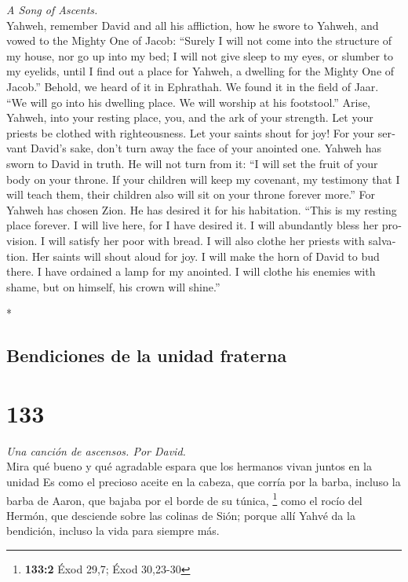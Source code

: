 \begin{paracol}{2}
\begin{otherlanguage}{english}
\emph{A Song of Ascents.}\\
 Yahweh, remember David and all his affliction,
 how he swore to Yahweh, and vowed to the Mighty One of
Jacob:  ``Surely I will not come into the structure of my
house, nor go up into my bed;  I will not give sleep to my
eyes, or slumber to my eyelids,  until I find out a place
for Yahweh, a dwelling for the Mighty One of Jacob.'' 
Behold, we heard of it in Ephrathah. We found it in the field of Jaar.
 ``We will go into his dwelling place. We will worship at
his footstool.''  Arise, Yahweh, into your resting place,
you, and the ark of your strength.  Let your priests be
clothed with righteousness. Let your saints shout for joy!
 For your servant David's sake, don't turn away the face
of your anointed one.  Yahweh has sworn to David in
truth. He will not turn from it: ``I will set the fruit of your body on
your throne.  If your children will keep my covenant, my
testimony that I will teach them, their children also will sit on your
throne forever more.''  For Yahweh has chosen Zion. He
has desired it for his habitation.  ``This is my resting
place forever. I will live here, for I have desired it. 
I will abundantly bless her provision. I will satisfy her poor with
bread.  I will also clothe her priests with salvation.
Her saints will shout aloud for joy.  I will make the
horn of David to bud there. I have ordained a lamp for my anointed.
 I will clothe his enemies with shame, but on himself,
his crown will shine.''

\end{otherlanguage}

\switchcolumn[0]*

\hypertarget{bendiciones-de-la-unidad-fraterna}{%
\subsection{Bendiciones de la unidad
fraterna}\label{bendiciones-de-la-unidad-fraterna}}

\hypertarget{section-264}{%
\section{133}\label{section-264}}

\emph{Una canción de ascensos. Por David.}\\
 Mira qué bueno y qué agradable espara que los hermanos
vivan juntos en la unidad  Es como el precioso aceite en
la cabeza, que corría por la barba, incluso la barba de Aaron, que
bajaba por el borde de su túnica, \footnote{\textbf{133:2} Éxod 29,7;
  Éxod 30,23-30}  como el rocío del Hermón, que desciende
sobre las colinas de Sión; porque allí Yahvé da la bendición, incluso la
vida para siempre más.


\end{paracol}
